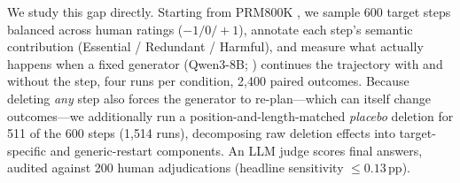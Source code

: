 \documentclass[11pt]{article}
\begin{document}
We study this gap directly. Starting from PRM800K \citep{lightman2024lets}, we sample 600 target steps balanced across human ratings ($-1/0/{+}1$), annotate each step's semantic contribution (Essential / Redundant / Harmful), and measure what actually happens when a fixed generator (Qwen3-8B; \citealp{qwen3_2025}) continues the trajectory with and without the step, four runs per condition, 2{,}400 paired outcomes. Because deleting \emph{any} step also forces the generator to re-plan---which can itself change outcomes---we additionally run a position-and-length-matched \emph{placebo} deletion for 511 of the 600 steps (1{,}514 runs), decomposing raw deletion effects into target-specific and generic-restart components. An LLM judge scores final answers, audited against 200 human adjudications (headline sensitivity $\le 0.13$\,pp).
\end{document}
